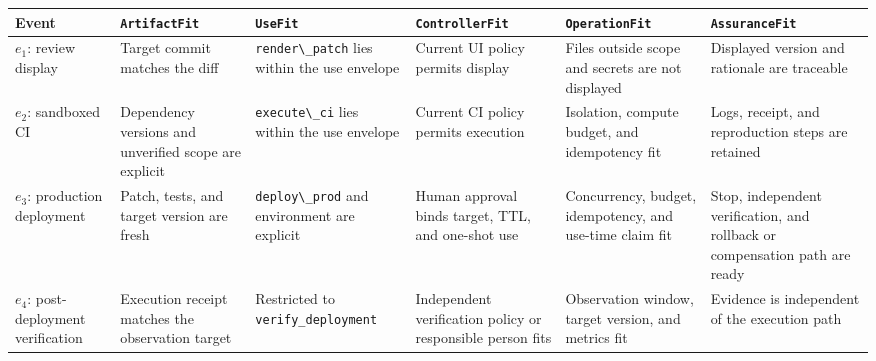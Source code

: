 {\def\LTcaptype{none} %
\begin{longtable}[]{@{}
  >{\raggedright\arraybackslash}p{}
  >{\raggedright\arraybackslash}p{}
  >{\raggedright\arraybackslash}p{}
  >{\raggedright\arraybackslash}p{}
  >{\raggedright\arraybackslash}p{}
  >{\raggedright\arraybackslash}p{}@{}}
\toprule\noalign{}
\begin{minipage}[b]{\linewidth}\raggedright
Event
\end{minipage} & \begin{minipage}[b]{\linewidth}\raggedright
\passthrough{\lstinline!ArtifactFit!}
\end{minipage} & \begin{minipage}[b]{\linewidth}\raggedright
\passthrough{\lstinline!UseFit!}
\end{minipage} & \begin{minipage}[b]{\linewidth}\raggedright
\passthrough{\lstinline!ControllerFit!}
\end{minipage} & \begin{minipage}[b]{\linewidth}\raggedright
\passthrough{\lstinline!OperationFit!}
\end{minipage} & \begin{minipage}[b]{\linewidth}\raggedright
\passthrough{\lstinline!AssuranceFit!}
\end{minipage} \\
\midrule\noalign{}
\endhead
\bottomrule\noalign{}
\endlastfoot
\(e_1\): review display & Target commit matches the diff & \passthrough{\lstinline!render\_patch!} lies within the use envelope & Current UI policy permits display & Files outside scope and secrets are not displayed & Displayed version and rationale are traceable \\
\(e_2\): sandboxed CI & Dependency versions and unverified scope are explicit & \passthrough{\lstinline!execute\_ci!} lies within the use envelope & Current CI policy permits execution & Isolation, compute budget, and idempotency fit & Logs, receipt, and reproduction steps are retained \\
\(e_3\): production deployment & Patch, tests, and target version are fresh & \passthrough{\lstinline!deploy\_prod!} and environment are explicit & Human approval binds target, TTL, and one-shot use & Concurrency, budget, idempotency, and use-time claim fit & Stop, independent verification, and rollback or compensation path are ready \\
\(e_4\): post-deployment verification & Execution receipt matches the observation target & Restricted to \texttt{verify\_\allowbreak{}deployment} & Independent verification policy or responsible person fits & Observation window, target version, and metrics fit & Evidence is independent of the execution path \\
\end{longtable}
}

